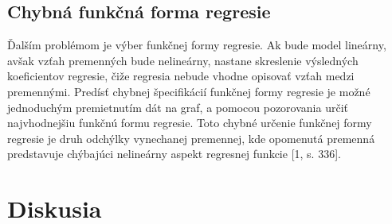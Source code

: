 \documentclass[]{tukediphc}
\begin{document}
\subsection{Chybná funkčná forma regresie}

Ďalším problémom je výber funkčnej formy regresie. Ak bude model lineárny, avšak vzťah premenných bude nelineárny, nastane skreslenie výsledných koeficientov regresie, čiže regresia nebude vhodne opisovať vzťah medzi premennými. Predísť chybnej špecifikácií funkčnej formy regresie je možné jednoduchým premietnutím dát na graf, a pomocou pozorovania určiť najvhodnejšiu funkčnú formu regresie. Toto chybné určenie funkčnej formy regresie je druh odchýlky vynechanej premennej, kde opomenutá premenná predstavuje chýbajúci nelineárny aspekt regresnej funkcie [1, s. 336]. 



\newpage
{}
\section*{Diskusia}
\end{document}
